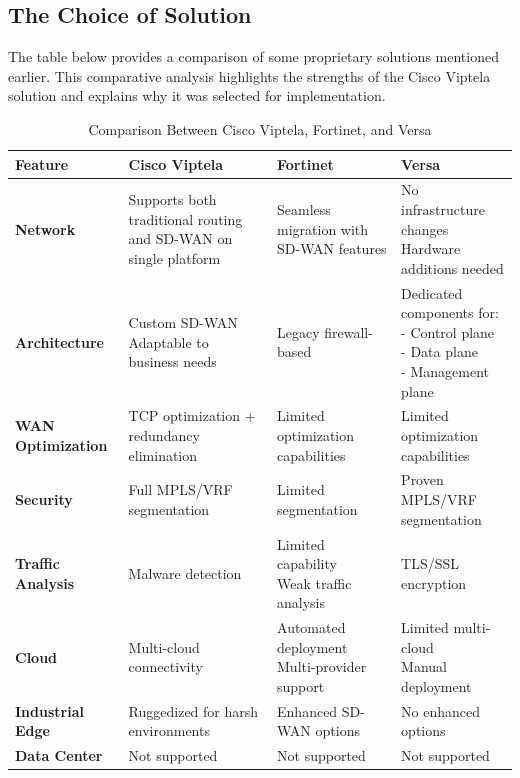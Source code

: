 \documentclass[12pt,english]{report}
\begin{document}
\subsection{The Choice of Solution}
The table below provides a comparison of some proprietary solutions mentioned earlier. This comparative analysis highlights the strengths of the Cisco Viptela solution and explains why it was selected for implementation.
\begin{table}[h]
\centering
\footnotesize
\caption{Comparison Between Cisco Viptela, Fortinet, and Versa}
\label{tab:sdwan_comparison}
\begin{tabularx}{\linewidth}{@{}>{\raggedright\arraybackslash}p{2.8cm}>{\raggedright\arraybackslash}X>{\raggedright\arraybackslash}X>{\raggedright\arraybackslash}X@{}}
\toprule
\textbf{Feature} & \textbf{Cisco Viptela} & \textbf{Fortinet} & \textbf{Versa} \\
\midrule
\textbf{Network} 
& Supports both traditional routing and SD-WAN on single platform 
& Seamless migration with SD-WAN features 
& \makecell[l]{No infrastructure changes \\ Hardware additions needed} \\
\midrule
\textbf{Architecture} 
& \makecell[l]{Custom SD-WAN\\ Adaptable to business needs} 
& Legacy firewall-based 
& \makecell[l]{Dedicated components for:\\ - Control plane\\ - Data plane\\ - Management plane} \\
\midrule
\textbf{WAN Optimization} 
& TCP optimization + redundancy elimination 
& Limited optimization capabilities 
& Limited optimization capabilities \\
\midrule
\textbf{Security} 
& Full MPLS/VRF segmentation 
& Limited segmentation 
& Proven MPLS/VRF segmentation \\
\midrule
\textbf{Traffic Analysis} 
& Malware detection 
& \makecell[l]{Limited capability\\ Weak traffic analysis} 
& TLS/SSL encryption \\
\midrule
\textbf{Cloud} 
& Multi-cloud connectivity 
& \makecell[l]{Automated deployment\\ Multi-provider support} 
& \makecell[l]{Limited multi-cloud\\ Manual deployment} \\
\midrule
\textbf{Industrial Edge} 
& Ruggedized for harsh environments 
& Enhanced SD-WAN options 
& No enhanced options \\
\midrule
\textbf{Data Center} 
& Not supported 
& Not supported 
& Not supported \\
\bottomrule
\end{tabularx}
\end{table}
\end{document}
